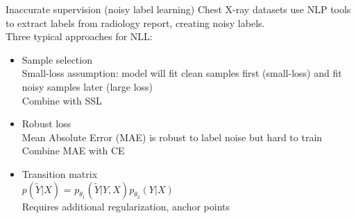 \documentclass[handout]{beamer}
\begin{document}
\begin{frame}{Inaccurate supervision (noisy label learning)}
    Chest X-ray datasets use NLP tools to extract labels from radiology report, creating noisy labels. \\
    Three typical approaches for NLL:
    \begin{itemize}
        \item Sample selection \\
        Small-loss assumption: model will fit clean samples first (small-loss) and fit noisy samples later (large loss) \\
        Combine with SSL
        \item Robust loss \\
        Mean Absolute Error (MAE) is robust to label noise but hard to train \\
        Combine MAE with CE
        \item Transition matrix \\
        $p(\tilde{Y}|X) $ = $p_{\theta_1}(\tilde{Y}|Y,X) p_{\theta_2}(Y|X)$ \\
        Requires additional regularization, anchor points
    \end{itemize}
\end{frame}


\end{document}
